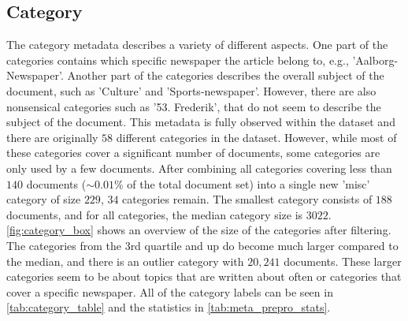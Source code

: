 \subsection{Category}
The category metadata describes a variety of different aspects.
One part of the categories contains which specific newspaper the article belong to, e.g., 'Aalborg-Newspaper'.
Another part of the categories describes the overall subject of the document, such as 'Culture' and 'Sports-newspaper'.
However, there are also nonsensical categories such as '53. Frederik', that do not seem to describe the subject of the document.
This metadata is fully observed within the dataset and there are originally $58$ different categories in the dataset.
However, while most of these categories cover a significant number of documents, some categories are only used by a few documents.
After combining all categories covering less than $140$ documents (${\sim}0.01\%$ of the total document set) into a single new 'misc' category of size $229$, $34$ categories remain.
The smallest category consists of $188$ documents, and for all categories, the median category size is $3022$.
\autoref{fig:category_box} shows an overview of the size of the categories after filtering.
The categories from the 3rd quartile and up do become much larger compared to the median, and there is an outlier category with $20,241$ documents.
These larger categories seem to be about topics that are written about often or categories that cover a specific newspaper.
All of the category labels can be seen in \autoref{tab:category_table} and the statistics in \autoref{tab:meta_prepro_stats}.

